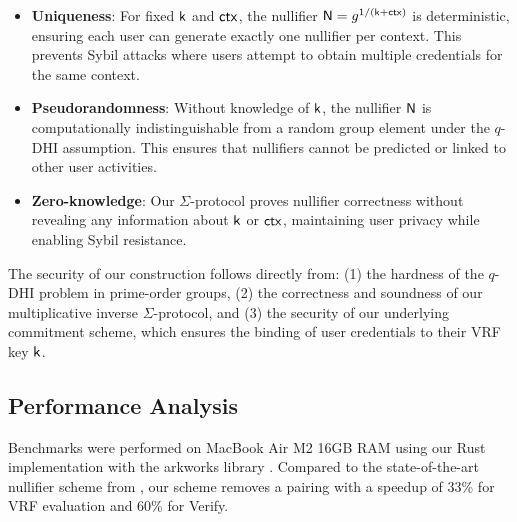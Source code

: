 \begin{itemize}
    \item \textbf{Uniqueness}: For fixed $\mathsf{k}$ and $\mathsf{ctx}$, the nullifier $\mathsf{N} = g^{1/(\mathsf{k} + \mathsf{ctx})}$ is deterministic, ensuring each user can generate exactly one nullifier per context. This prevents Sybil attacks where users attempt to obtain multiple credentials for the same context.
    
    \item \textbf{Pseudorandomness}: Without knowledge of $\mathsf{k}$, the nullifier $\mathsf{N}$ is computationally indistinguishable from a random group element under the $q$-DHI assumption. This ensures that nullifiers cannot be predicted or linked to other user activities.
    
    \item \textbf{Zero-knowledge}: Our $\Sigma$-protocol proves nullifier correctness without revealing any information about $\mathsf{k}$ or $\mathsf{ctx}$, maintaining user privacy while enabling Sybil resistance.
\end{itemize}

The security of our construction follows directly from: (1) the hardness of the $q$-DHI problem in prime-order groups, (2) the correctness and soundness of our multiplicative inverse $\Sigma$-protocol, and (3) the security of our underlying commitment scheme, which ensures the binding of user credentials to their VRF key $\mathsf{k}$.



\subsection{Performance Analysis}
Benchmarks were performed on MacBook Air M2 16GB RAM using our Rust implementation with the arkworks library \cite{arkworks_contributors_arkworks_2022}. Compared to the state-of-the-art nullifier scheme from \cite{tomescu2022utt}, our scheme removes a pairing with a speedup of 33\% for VRF evaluation and 60\% for Verify.

